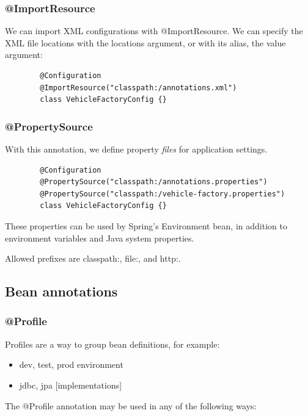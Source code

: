 \documentclass{scrartcl}
\begin{document}
\subsubsection{@ImportResource}

    We can import XML configurations with @ImportResource. We can specify the XML file locations with the locations argument, or with its alias, the value argument:

    \begin{lstlisting}
        @Configuration
        @ImportResource("classpath:/annotations.xml")
        class VehicleFactoryConfig {}
    \end{lstlisting}

\subsubsection{@PropertySource}

    With this annotation, we define property \textit{files} for application settings.

    \begin{lstlisting}
        @Configuration
        @PropertySource("classpath:/annotations.properties")
        @PropertySource("classpath:/vehicle-factory.properties")
        class VehicleFactoryConfig {}
    \end{lstlisting}

    These properties can be used by Spring's Environment bean, in addition to environment variables and Java system properties.

    Allowed prefixes are classpath:, file:, and http:.

\subsection{Bean annotations}

\subsubsection{@Profile}

    Profiles are a way to group bean definitions, for example:

     \begin{itemize}
        \item dev, test, prod environment
        \item jdbc, jpa [implementations]
    \end{itemize}

   The @Profile annotation may be used in any of the following ways:
\end{document}
